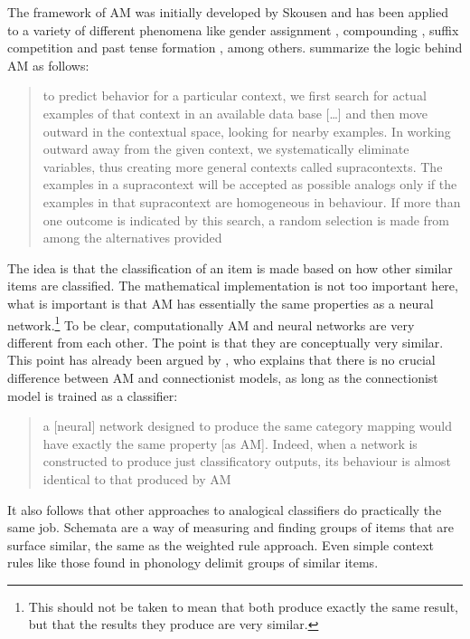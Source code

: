 The framework of AM was initially developed by Skousen \autocites{Skousen.1989, Skousen.2002, Skousen.2013} and has been applied to a variety of different phenomena like gender assignment \autocites{Eddington.2002, Eddington.2004}, compounding \autocite{Arndt-Lappe.2011}, suffix competition \autocite{Arndt-Lappe.2014} and past tense formation \autocite{Derwing.1994}, among others. \textcite[193]{Derwing.1994} summarize the logic behind AM as follows:

\begin{quotation}
to predict behavior for a particular context, we first search for actual examples of that context in an available data base [\dots] and then move outward in the contextual space, looking for nearby examples. In working outward away from the given context, we systematically eliminate variables, thus creating more general contexts called supracontexts. The examples in a supracontext will be accepted as possible analogs only if the examples in that supracontext are homogeneous in behaviour. If more than one outcome is indicated by this search, a random selection is made from among the alternatives provided
\autocite[193]{Derwing.1994}
\end{quotation}

The idea is that the classification of an item is made based on how other similar items are classified. The mathematical implementation is not too important here, what is important is that AM has essentially the same properties as a neural network.\footnote{This should not be taken to mean that both produce exactly the same result, but that the results they produce are very similar.} To be clear, computationally AM and neural networks are very different from each other. The point is that they are conceptually very similar. This point has already been argued by \textcite[289]{Matthews.2005}, who explains that there is no crucial difference between AM and connectionist models, as long as the connectionist model is trained as a classifier:

\begin{quotation}
a [neural] network designed to produce the same category mapping would have exactly the same property [as AM]. Indeed, when a network is constructed to produce just classificatory outputs, its behaviour is almost identical to that produced by AM
\autocite[289]{Matthews.2005}
\end{quotation}

It also follows that other approaches to analogical classifiers do practically the same job. Schemata are a way of measuring and finding groups of items that are surface similar, the same as the weighted rule approach. Even simple context rules like those found in phonology delimit groups of similar items.


